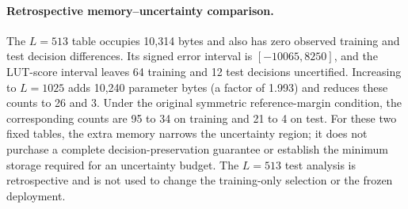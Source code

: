 \paragraph{Retrospective memory--uncertainty comparison.}
The $L=513$ table occupies 10,314 bytes and also has zero observed training
and test decision differences. Its signed error interval is $[-10065,8250]$,
and the LUT-score interval leaves 64 training and 12 test decisions
uncertified. Increasing to $L=1025$ adds 10,240 parameter bytes (a factor of
1.993) and reduces these counts to 26 and 3. Under the original symmetric
reference-margin condition, the corresponding counts are 95 to 34 on
training and 21 to 4 on test. For these two fixed tables, the extra memory narrows the uncertainty
region; it does not purchase a complete decision-preservation guarantee
or establish the minimum storage required for an uncertainty budget.
The $L=513$ test analysis is retrospective and is not used to change the
training-only selection or the frozen deployment.
